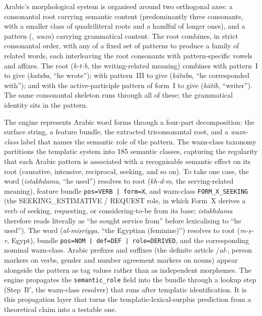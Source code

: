 Arabic's morphological system is organised around two orthogonal axes: a consonantal root carrying semantic content (predominantly three consonants, with a smaller class of quadriliteral roots and a handful of longer ones), and a pattern (, \emph{wazn}) carrying grammatical content. The root combines, in strict consonantal order, with any of a fixed set of patterns to produce a family of related words, each interleaving the root consonants with pattern-specific vowels and affixes. The root  (\emph{k-t-b}, the writing-related meaning) combines with pattern~I to give  (\emph{kataba}, ``he wrote''); with pattern~III to give  (\emph{k\=ataba}, ``he corresponded with''); and with the active-participle pattern of form~I to give  (\emph{k\=atib}, ``writer''). The same consonantal skeleton runs through all of these; the grammatical identity sits in the pattern.

The engine represents Arabic word forms through a four-part decomposition: the surface string, a feature bundle, the extracted triconsonantal root, and a \emph{wazn-class} label that names the semantic role of the pattern. The wazn-class taxonomy partitions the templatic system into 185 semantic classes, capturing the regularity that each Arabic pattern is associated with a recognisable semantic effect on its root (causative, intensive, reciprocal, seeking, and so on). To take one case, the word  (\emph{istakhdama}, ``he used'') resolves to root  (\emph{kh-d-m}, the serving-related meaning), feature bundle \texttt{pos=VERB | form=X}, and wazn-class \texttt{FORM\_X\_SEEKING} (the SEEKING\_ESTIMATIVE / REQUEST role, in which Form~X derives a verb of seeking, requesting, or considering-to-be from its base; \emph{istakhdama} therefore reads literally as ``he sought service from'' before lexicalising to ``he used''). The word  (\emph{al-mi\d{s}riyya}, ``the Egyptian (feminine)'') resolves to root  (\emph{m-\d{s}-r}, Egypt), bundle \texttt{pos=NOM | def=DEF | role=DERIVED}, and the corresponding nominal wazn-class. Arabic prefixes and suffixes (the definite article \mbox{/\emph{al-},} person markers on verbs, gender and number agreement markers on nouns) appear alongside the pattern as tag values rather than as independent morphemes. The engine propagates the \texttt{semantic\_role} field into the bundle through a lookup step (Step~B$'$, the wazn-class resolver) that runs after templatic identification. It is this propagation layer that turns the templatic-lexical-surplus prediction from a theoretical claim into a testable one.


